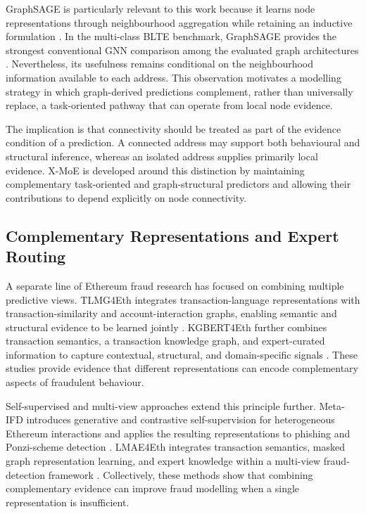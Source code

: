 \documentclass{ieeeaccess}
\begin{document}
GraphSAGE is particularly relevant to this work because it learns node representations through neighbourhood aggregation while retaining an inductive formulation \cite{hamilton2017graphsage}. In the multi-class BLTE benchmark, GraphSAGE provides the strongest conventional GNN comparison among the evaluated graph architectures \cite{alemari2026multiclass}. Nevertheless, its usefulness remains conditional on the neighbourhood information available to each address. This observation motivates a modelling strategy in which graph-derived predictions complement, rather than universally replace, a task-oriented pathway that can operate from local node evidence.

The implication is that connectivity should be treated as part of the evidence condition of a prediction. A connected address may support both behavioural and structural inference, whereas an isolated address supplies primarily local evidence. X-MoE is developed around this distinction by maintaining complementary task-oriented and graph-structural predictors and allowing their contributions to depend explicitly on node connectivity.

\subsection{Complementary Representations and Expert Routing}

A separate line of Ethereum fraud research has focused on combining multiple predictive views. TLMG4Eth integrates transaction-language representations with transaction-similarity and account-interaction graphs, enabling semantic and structural evidence to be learned jointly \cite{sun2025tlmg4eth}. KGBERT4Eth further combines transaction semantics, a transaction knowledge graph, and expert-curated information to capture contextual, structural, and domain-specific signals \cite{jia2026kgbert4eth}. These studies provide evidence that different representations can encode complementary aspects of fraudulent behaviour.

Self-supervised and multi-view approaches extend this principle further. Meta-IFD introduces generative and contrastive self-supervision for heterogeneous Ethereum interactions and applies the resulting representations to phishing and Ponzi-scheme detection \cite{jin2025metaifd}. LMAE4Eth integrates transaction semantics, masked graph representation learning, and expert knowledge within a multi-view fraud-detection framework \cite{jia2025lmae4eth}. Collectively, these methods show that combining complementary evidence can improve fraud modelling when a single representation is insufficient.
\end{document}
